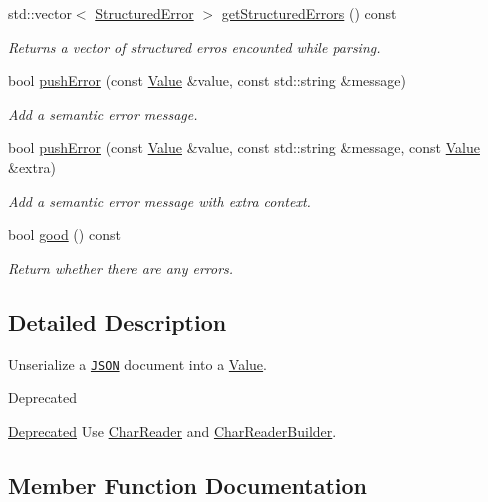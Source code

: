 \begin{DoxyCompactItemize}
std\+::vector$<$ \hyperlink{struct_json_1_1_reader_1_1_structured_error}{Structured\+Error} $>$ \hyperlink{class_json_1_1_reader_a08c2ea5ffc7d2a9c9e35020835624f0b}{get\+Structured\+Errors} () const 
\begin{DoxyCompactList}\small\item\em Returns a vector of structured erros encounted while parsing. \end{DoxyCompactList}\item 
bool \hyperlink{class_json_1_1_reader_ade6c28e0ef00d8f2e0aa2283f91c3e37}{push\+Error} (const \hyperlink{class_json_1_1_value}{Value} \&value, const std\+::string \&message)
\begin{DoxyCompactList}\small\item\em Add a semantic error message. \end{DoxyCompactList}\item 
bool \hyperlink{class_json_1_1_reader_a9b474233c3a7c688e340e70665d45223}{push\+Error} (const \hyperlink{class_json_1_1_value}{Value} \&value, const std\+::string \&message, const \hyperlink{class_json_1_1_value}{Value} \&extra)
\begin{DoxyCompactList}\small\item\em Add a semantic error message with extra context. \end{DoxyCompactList}\item 
bool \hyperlink{class_json_1_1_reader_a06b52dcc656549506b1ae6f05167ecf4}{good} () const 
\begin{DoxyCompactList}\small\item\em Return whether there are any errors. \end{DoxyCompactList}\end{DoxyCompactItemize}


\subsection{Detailed Description}
Unserialize a \href{http://www.json.org}{\tt J\+S\+O\+N} document into a \hyperlink{class_json_1_1_value}{Value}. 

\begin{DoxyRefDesc}{Deprecated}
\item[\hyperlink{deprecated__deprecated000005}{Deprecated}]Use \hyperlink{class_json_1_1_char_reader}{Char\+Reader} and \hyperlink{class_json_1_1_char_reader_builder}{Char\+Reader\+Builder}. \end{DoxyRefDesc}


\subsection{Member Function Documentation}
\hypertarget{class_json_1_1_reader_afa4a59e962d23c4d1c38b433fc95eefa}{}
